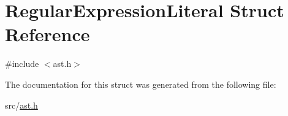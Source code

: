 \hypertarget{struct_regular_expression_literal}{}\section{Regular\+Expression\+Literal Struct Reference}
\label{struct_regular_expression_literal}


{\ttfamily \#include $<$ast.\+h$>$}



The documentation for this struct was generated from the following file\+:\begin{DoxyCompactItemize}
\item 
src/\hyperlink{ast_8h}{ast.\+h}\end{DoxyCompactItemize}
